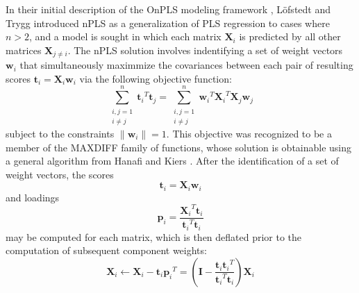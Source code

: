 \begin{doublespace}
In their initial description of the OnPLS modeling framework
\cite{lofstedt:jchemo2011}, L\"{o}fstedt and Trygg introduced nPLS as a
generalization of PLS regression to cases where $n>2$, and a model is
sought in which each matrix $\mathbf{X}_i$ is predicted by all other
matrices $\mathbf{X}_{j \ne i}$. The nPLS solution involves indentifying
a set of weight vectors $\mathbf{w}_i$ that simultaneously maximmize the
covariances between each pair of resulting scores
$\mathbf{t}_i = \mathbf{X}_i \mathbf{w}_i$ via the following objective
function:
\begin{equation}
\sum_{\substack{i,j=1\\ i \ne j}}^n
 {\mathbf{t}_i}^T \mathbf{t}_j =
\sum_{\substack{i,j=1\\ i \ne j}}^n
 {\mathbf{w}_i}^T {\mathbf{X}_i}^T \mathbf{X}_j \mathbf{w}_j
\end{equation}
subject to the constraints $\|\mathbf{w}_i\|=1$. This objective was recognized
to be a member of the MAXDIFF family of functions, whose solution is obtainable
using a general algorithm from Hanafi and Kiers \cite{hanafi:csda2006}. After
the identification of a set of weight vectors, the scores
\begin{equation*}
\mathbf{t}_i = \mathbf{X}_i \mathbf{w}_i
\end{equation*}
and loadings
\begin{equation*}
\mathbf{p}_i = \frac{{\mathbf{X}_i}^T \mathbf{t}_i}
                    {{\mathbf{t}_i}^T \mathbf{t}_i}
\end{equation*}
may be computed for each matrix, which is then deflated prior to the
computation of subsequent component weights:
\begin{equation}
\mathbf{X}_i \gets \mathbf{X}_i - \mathbf{t}_i {\mathbf{p}_i}^T =
 \left( \mathbf{I} - \frac{\mathbf{t}_i {\mathbf{t}_i}^T}
                          {{\mathbf{t}_i}^T \mathbf{t}_i}
 \right) \mathbf{X}_i
\end{equation}


\end{doublespace}
